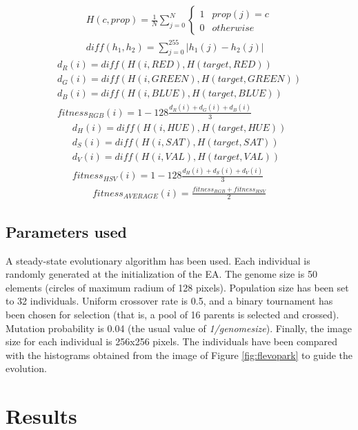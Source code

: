 \documentclass[conference]{IEEEtran}
\begin{document}
\begin{eqnarray}
	\label{eq:histogram}
	H(c, prop) = \frac{1}{N}\sum_{j=0}^N \left\{\begin{matrix}
1 & prop(j) = c\\ 
0 & otherwise
\end{matrix}\right. \\
\label{eq:diff}
diff(h_1, h_2) = \sum_{j=0}^{255} |h_1(j) - h_2(j)|
\end{eqnarray}
\begin{eqnarray}
	d_R(i) = diff(H(i, RED), H(target, RED))\\
	d_G(i) = diff(H(i, GREEN), H(target, GREEN))\\
	d_B(i) =  diff(H(i, BLUE), H(target, BLUE))\\
	\label{eq:RGB}
	fitness_{RGB}(i) = 1 - 128\frac{d_R(i) + d_G(i) + d_B(i)}{3}
\end{eqnarray}
\begin{eqnarray}
	d_H(i) = diff(H(i, HUE), H(target, HUE))\\
	d_S(i) = diff(H(i, SAT), H(target, SAT))\\
	d_V(i) =  diff(H(i, VAL), H(target, VAL))\\
	\label{eq:HSV}
	fitness_{HSV}(i) = 1 - 128\frac{d_H(i) + d_S(i) + d_V(i)}{3}
\end{eqnarray}
\begin{eqnarray}
	\label{eq:AVERAGE}
	fitness_{AVERAGE}(i) = \frac{fitness_{RGB}+fitness_{HSV}}{2}
\end{eqnarray}


\subsection{Parameters used}

A steady-state evolutionary algorithm has been used. Each individual is randomly generated at the initialization of the EA. The genome size is 50 elements (circles of maximum radium of 128 pixels). Population size has been set to 32 individuals. Uniform crossover rate is 0.5, and a binary tournament has been chosen for selection (that is, a pool of 16 parents is selected and crossed). Mutation probability is 0.04 (the usual value of {\em 1/genomesize}). Finally, the image size for each individual is 256x256 pixels. The individuals have been compared with the histograms obtained from the image of Figure \ref{fig:flevopark} to guide the evolution.

\section{Results} 
\label{sec:results}
\end{document}
